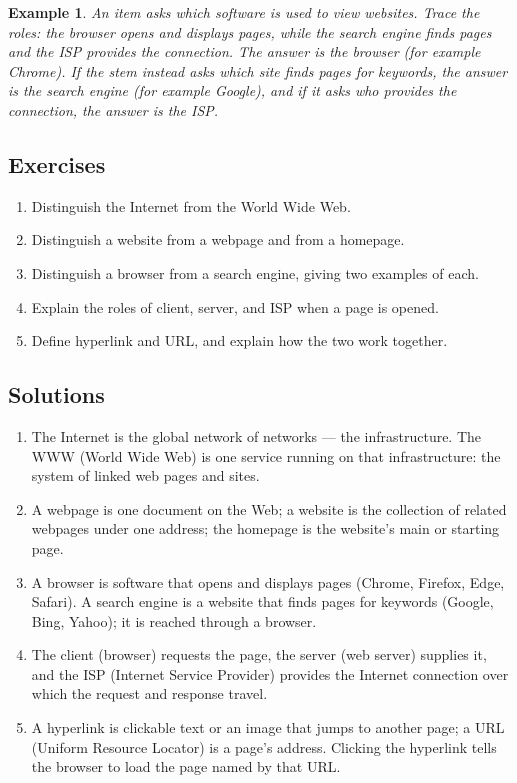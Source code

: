 \documentclass[11pt]{article}
\newtheorem{example}{Example}[section]
\begin{document}
\begin{example}
An item asks which software is used to view websites. Trace the roles: the
browser opens and displays pages, while the search engine finds pages and
the ISP provides the connection. The answer is the browser (for example
Chrome). If the stem instead asks which site finds pages for keywords, the
answer is the search engine (for example Google), and if it asks who
provides the connection, the answer is the ISP.
\end{example}

\subsection*{Exercises}
\begin{enumerate}[label=\arabic*.]
  \item Distinguish the Internet from the World Wide Web.
  \item Distinguish a website from a webpage and from a homepage.
  \item Distinguish a browser from a search engine, giving two examples of
    each.
  \item Explain the roles of client, server, and ISP when a page is opened.
  \item Define hyperlink and URL, and explain how the two work together.
\end{enumerate}

\subsection*{Solutions}
\begingroup\small
\begin{enumerate}[label=\arabic*.]
  \item The Internet is the global network of networks --- the
    infrastructure. The WWW (World Wide Web) is one service running on that
    infrastructure: the system of linked web pages and sites.
  \item A webpage is one document on the Web; a website is the collection of
    related webpages under one address; the homepage is the website's main or
    starting page.
  \item A browser is software that opens and displays pages (Chrome, Firefox,
    Edge, Safari). A search engine is a website that finds pages for keywords
    (Google, Bing, Yahoo); it is reached through a browser.
  \item The client (browser) requests the page, the server (web server)
    supplies it, and the ISP (Internet Service Provider) provides the
    Internet connection over which the request and response travel.
  \item A hyperlink is clickable text or an image that jumps to another page;
    a URL (Uniform Resource Locator) is a page's address. Clicking the
    hyperlink tells the browser to load the page named by that URL.
\end{enumerate}
\endgroup
\end{document}

